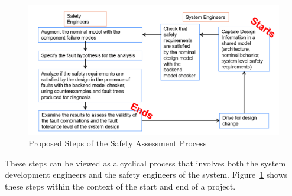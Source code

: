 \begin{figure}[h]
	\begin{center}
		\includegraphics[width=\textwidth]{images/SACycle.PNG}
	\end{center}
	\caption{Proposed Steps of the Safety Assessment Process}
	\label{fig:SACycle1}
\end{figure}

These steps can be viewed as a cyclical process that involves both the system development engineers and the safety engineers of the system. Figure~\ref{fig:SACycle1} shows these steps within the context of the start and end of a project. 

